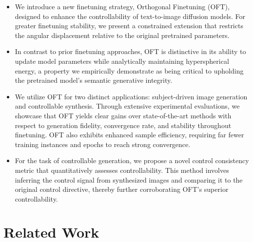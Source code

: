 \begin{itemize}[leftmargin=*,nosep]

    \item We introduce a new finetuning strategy, Orthogonal Finetuning (OFT), designed to enhance the controllability of text-to-image diffusion models. For greater finetuning stability, we present a constrained extension that restricts the angular displacement relative to the original pretrained parameters.
    \item In contrast to prior finetuning approaches, OFT is distinctive in its ability to update model parameters while analytically maintaining hyperspherical energy, a property we empirically demonstrate as being critical to upholding the pretrained model’s semantic generative integrity.
    \item We utilize OFT for two distinct applications: subject-driven image generation and controllable synthesis. Through extensive experimental evaluations, we showcase that OFT yields clear gains over state-of-the-art methods with respect to generation fidelity, convergence rate, and stability throughout finetuning. OFT also exhibits enhanced sample efficiency, requiring far fewer training instances and epochs to reach strong convergence.
    \item For the task of controllable generation, we propose a novel control consistency metric that quantitatively assesses controllability. This method involves inferring the control signal from synthesized images and comparing it to the original control directive, thereby further corroborating OFT’s superior controllability.
\end{itemize}

\section{Related Work}

